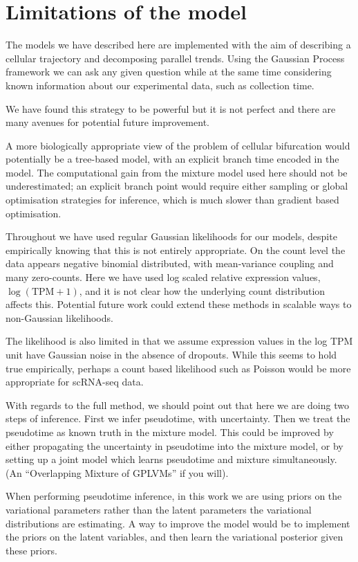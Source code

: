 \section{Limitations of the  model}

The models we have described here are implemented with the aim of describing a cellular trajectory and decomposing parallel trends. Using the Gaussian Process framework we can ask any given question while at the same time considering known information about our experimental data, such as collection time.

We have found this strategy to be powerful but it is not perfect and there are many avenues for potential future improvement.

A more biologically appropriate view of the problem of cellular bifurcation would  potentially be a tree-based model, with an explicit branch time encoded in the model. The computational gain from the mixture model used here should not be underestimated; an explicit branch point would require either sampling or global optimisation strategies for inference, which is much slower than gradient based optimisation.

Throughout we have used regular Gaussian likelihoods for our models, despite empirically knowing that this is not entirely appropriate. On the count level the data appears negative binomial distributed, with mean-variance coupling and many zero-counts. Here we have used log scaled relative expression values,  $ \log \left( \text{TPM} + 1 \right) $, and it is not clear how the underlying count distribution affects this. Potential future work could extend these methods in scalable ways to non-Gaussian likelihoods.

The likelihood is also limited in that we assume expression values in the log TPM unit have Gaussian noise in the absence of dropouts. While this seems to hold true empirically, perhaps a count based likelihood such as Poisson would be more appropriate for scRNA-seq data.

With regards to the full method, we should point out that here we are doing two steps of inference. First we infer pseudotime, with uncertainty. Then we treat the pseudotime as known truth in the mixture model. This could be improved by either propagating the uncertainty in pseudotime into the mixture model, or by setting up a joint model which learns pseudotime and mixture simultaneously. (An ``Overlapping Mixture of GPLVMs'' if you will).

When performing pseudotime inference, in this work we are using priors on the variational parameters rather than the latent parameters the variational distributions are estimating. A way to improve the model would be to implement the priors on the latent variables, and then learn the variational posterior given these priors.

